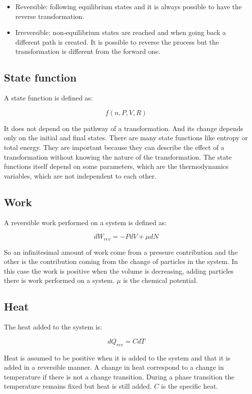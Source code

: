 	\begin{multicols}{2}
		\begin{itemize}
			\item Reversible: following equilibrium states and it is always possible to have the reverse transformation.
			\item Irreversible: non-equilibrium states are reached and when going back a different path is created.
				It is possible to reverse the process but the transformation is different from the forward one.
		\end{itemize}
	\end{multicols}

	\subsection{State function}
	A state function is defined as:

	$$f(n, P, V, R)$$

	It does not depend on the pathway of a transformation.
	And its change depends only on the initial and final states.
	There are many state functions like entropy or total energy.
	They are important because they can describe the effect of a transformation without knowing the nature of the transformation.
	The state functions itself depend on some parameters, which are the thermodynamics variables, which are not independent to each other.

	\subsection{Work}
	A reversible work performed on a system is defined as:

	$$dW_{rev} = -PdV + \mu dN$$

	So an infinitesimal amount of work come from a pressure contribution and the other is the contribution coming from the change of particles in the system.
	In this case the work is positive when the volume is decreasing, adding particles there is work performed on a system.
	$\mu$ is the chemical potential.

	\subsection{Heat}
	The heat added to the system is:

	$$dQ_{rev} = CdT$$

	Heat is assumed to be positive when it is added to the system and that it is added in a reversible manner.
	A change in heat correspond to a change in temperature if there is not a change transition.
	During a phase transition the temperature remains fixed but heat is still added.
	$C$ is the specific heat.

